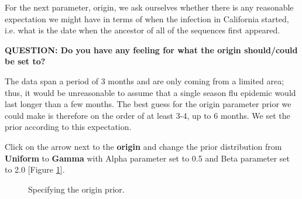 \documentclass[11pt]{article}
\begin{document}
For the next parameter, origin, we ask ourselves whether there is any reasonable expectation we might have in terms of when the infection in California started, i.e. what is the date when the ancestor of all of the sequences first appeared.

\begin{framed}
{\bf QUESTION: Do you have any feeling for what the origin should/could be set to?} 
\end{framed}

The data span a period of 3 months and are only coming from a limited area; thus, it would be unreasonable to assume that a single season flu epidemic would last longer than a few months. The best guess for the origin parameter prior we could make is  therefore on the order of at least 3-4, up to 6 months. We set the prior according to this expectation.

\begin{framed}
Click on the arrow next to the \textbf{origin} and change the prior distribution from \textbf{Uniform} to \textbf{Gamma} with Alpha parameter set to 0.5 and Beta parameter set to 2.0 [Figure \ref{originPrior}].
%
\end{framed}

\begin{figure}[h!]
\centering
{}
\caption{\small Specifying the origin prior.}
\label{originPrior}
\end{figure}

%
%
%
\end{document}

